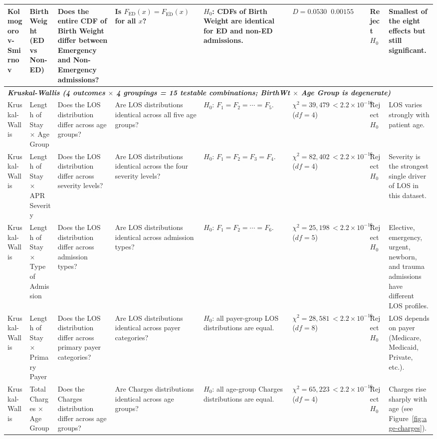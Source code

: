 \documentclass[12pt]{article}
\begin{document}
\begin{landscape}
\begin{scriptsize}
\begin{longtable}{p{2.0cm} p{2.4cm} p{3.0cm} p{2.7cm} p{2.5cm} p{1.7cm} p{1.3cm} p{1.3cm} p{3.0cm}}
Kolmogorov-Smirnov & Birth Weight (ED vs Non-ED) & Does the entire CDF of Birth Weight differ between Emergency and Non-Emergency admissions? & Is $F_{\mathrm{ED}}(x) = F_{\overline{\mathrm{ED}}}(x)$ for all $x$? & $H_0$: CDFs of Birth Weight are identical for ED and non-ED admissions. & $D = 0.0530$ & $0.00155$ & Reject $H_0$ & Smallest of the eight effects but still significant. \\

\midrule
\multicolumn{9}{l}{\textit{\textbf{Kruskal-Wallis (4 outcomes $\times$ 4 groupings = 15 testable combinations; BirthWt $\times$ Age Group is degenerate)}}} \\

Kruskal-Wallis & Length of Stay $\times$ Age Group & Does the LOS distribution differ across age groups? & Are LOS distributions identical across all five age groups? & $H_0$: $F_1 = F_2 = \cdots = F_5$. & $\chi^2 = 39{,}479$ ($df=4$) & $< 2.2 \times 10^{-16}$ & Reject $H_0$ & LOS varies strongly with patient age. \\

Kruskal-Wallis & Length of Stay $\times$ APR Severity & Does the LOS distribution differ across severity levels? & Are LOS distributions identical across the four severity levels? & $H_0$: $F_1 = F_2 = F_3 = F_4$. & $\chi^2 = 82{,}402$ ($df=4$) & $< 2.2 \times 10^{-16}$ & Reject $H_0$ & Severity is the strongest single driver of LOS in this dataset. \\

Kruskal-Wallis & Length of Stay $\times$ Type of Admission & Does the LOS distribution differ across admission types? & Are LOS distributions identical across admission types? & $H_0$: $F_1 = F_2 = \cdots = F_6$. & $\chi^2 = 25{,}198$ ($df=5$) & $< 2.2 \times 10^{-16}$ & Reject $H_0$ & Elective, emergency, urgent, newborn, and trauma admissions have different LOS profiles. \\

Kruskal-Wallis & Length of Stay $\times$ Primary Payer & Does the LOS distribution differ across primary payer categories? & Are LOS distributions identical across payer categories? & $H_0$: all payer-group LOS distributions are equal. & $\chi^2 = 28{,}581$ ($df=8$) & $< 2.2 \times 10^{-16}$ & Reject $H_0$ & LOS depends on payer (Medicare, Medicaid, Private, etc.). \\

Kruskal-Wallis & Total Charges $\times$ Age Group & Does the Charges distribution differ across age groups? & Are Charges distributions identical across age groups? & $H_0$: all age-group Charges distributions are equal. & $\chi^2 = 65{,}223$ ($df=4$) & $< 2.2 \times 10^{-16}$ & Reject $H_0$ & Charges rise sharply with age (see Figure~\ref{fig:age-charges}). \\


\end{longtable}
\end{scriptsize}
\end{landscape}
\end{document}
